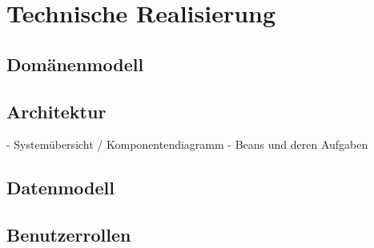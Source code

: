 \section{Technische Realisierung}

\subsection{Domänenmodell}


\subsection{Architektur}
- Systemübersicht / Komponentendiagramm
- Beans und deren Aufgaben


\subsection{Datenmodell}

\subsection{Benutzerrollen}




